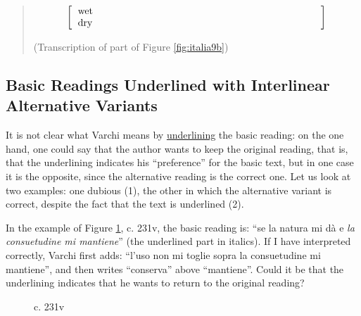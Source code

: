 \begin{paper}
\begin{quote}
\begin{center}
\begin{equation*}
	\left[\begin{tabular}{p{.70\textwidth}}
   		\text{wet} \\
    	\text{dry} \\
	\end{tabular}\right]
\end{equation*}

\end{center}
\begin{flushright}
(Transcription of part of Figure \ref{fig:italia9b})
\end{flushright}
\end{quote}

\subsection{Basic Readings Underlined with Interlinear Alternative Variants}

It is not clear what Varchi means by \uline{underlining} the basic
reading: on the one hand, one could say that the author wants to keep
the original reading, that is, that the underlining indicates his
``preference'' for the basic text, but in one case it is the opposite,
since the alternative reading is the correct one. Let us look at two
examples: one dubious (1), the other in which the alternative variant is
correct, despite the fact that the text is underlined (2).

In the example of Figure \ref{fig:italia9c}, c. 231v, the basic reading is: ``se la natura mi dà e \emph{la consuetudine mi mantiene}'' (the underlined part in italics). If I have interpreted correctly, Varchi first adds:
``l'uso non mi toglie sopra la consuetudine mi mantiene'', and then writes ``conserva'' above ``mantiene''. Could it be that the underlining indicates that he wants to return to the original reading?

\begin{figure}[H]
    \centering
    \caption{c. 231v}
    \label{fig:italia9c}
\end{figure}


\end{paper}
